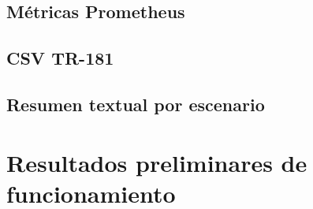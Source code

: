 \subsection{Métricas Prometheus}
\label{subsec:metricas-prometheus}

\subsection{CSV TR-181}
\label{subsec:csv-tr181}

\subsection{Resumen textual por escenario}
\label{subsec:resumen-textual-escenario}


\section{Resultados preliminares de funcionamiento}
\label{sec:resultados-preliminares-funcionamiento}